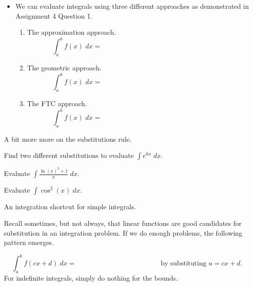 \documentclass[../main.tex]{subfiles}
\begin{document}
\begin{enumerate}[wide, label=\textbf{Part~\arabic*}.]
\begin{itemize}
        \item We can evaluate integrals using three different approaches as demonstrated in Assignment 4 Question 1.

          \begin{enumerate}
            \item The approximation approach. 
              \[
                \int_{a}^{b} f(x) \;dx = \hspace{3in}
              \]

            \item The geometric approach. 
              \[
                \int_{a}^{b} f(x) \;dx = \hspace{3in}
              \]

            \item The FTC approach. 
              \[
                \int_{a}^{b} f(x) \;dx = \hspace{3in}
              \]
          \end{enumerate}
      \end{itemize}
  \end{enumerate}

  \clearpage
  A bit more more on the substitutions rule. 

  \begin{example}
    Find two different substitutions to evaluate \(\int e^{6x} \;dx\).
  \end{example}

  \begin{example}
    Evaluate \(\int \frac{\ln(x)^{2} + 1}{x} \;dx\).
  \end{example}

  \begin{example}
    Evaluate \(\int \cos^{2}(x) \;dx\).
  \end{example}

  \clearpage
  An integration shortcut for simple integrals.

  Recall sometimes, but not always, that linear functions are good candidates for substitution in an integration problem. If we do enough problems, the following pattern emerges.
  \begin{mdframed}[style=simple]
    \begin{equation} \label{eq:integration-affine-substitution}
      \int_{a}^{b} f(cx+ d) \;dx = \hspace{2in} \text{ by substituting } u = cx + d.
    \end{equation}
  For indefinite integrals, simply do nothing for the bounds. 
  \end{mdframed}
  
\end{document}

